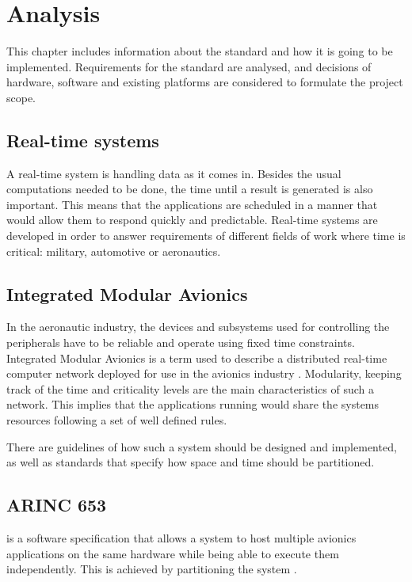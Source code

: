 
\chapter{Analysis}\label{chap:analysis}
This chapter includes information about 
the standard and how it is going to be implemented.
Requirements for the standard are analysed, 
and decisions of hardware, software and 
existing platforms are considered
to formulate the project scope.

\section{Real-time systems}
A real-time system is handling data as it comes in.
Besides the usual computations needed to be done,
the time until a result is generated is also important.
This means that the applications are scheduled in a manner 
that would allow them to respond quickly and predictable.
Real-time systems are developed in order to answer 
requirements of different fields of work
where time is critical: military, automotive or aeronautics.

\section{Integrated Modular Avionics}
In the aeronautic industry, the devices and subsystems used for
controlling the peripherals have to be reliable and operate using
fixed time constraints. Integrated Modular Avionics is a term used
to describe a distributed real-time computer network deployed for
use in the avionics industry \cite{ima_description}.
Modularity, keeping track of the time and criticality levels are
the main characteristics of such a network.
This implies that the applications running would share the 
system\textquotesingle s resources following a set of well defined rules.

There are guidelines of how such a system should be designed and
implemented, as well as standards that specify how space and time 
should be partitioned.


\section{ARINC 653}
\arinc{} is a software specification that allows a system to host 
multiple avionics applications on the same hardware while being able
to execute them independently. This is achieved by partitioning the
system \cite{arinc_2}.

